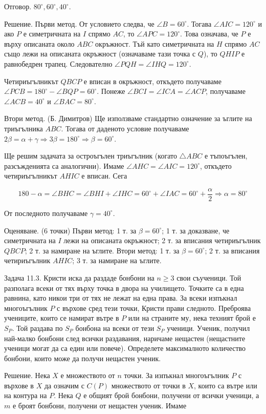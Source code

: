 Отговор. $80^\circ,60^\circ,40^\circ$.

Решение. Първи метод. От условието следва, че $\angle B=60^\circ$. Тогава $\angle AIC=120^\circ$ и ако $P$ е симетричната на $I$ спрямо $AC$, то $\angle APC=120^\circ$. Това означава, че $P$ е върху описаната около $ABC$ окръжност. Тъй като симетричната на $H$ спрямо $AC$ също лежи на описаната окръжност (означаваме тази точка с $Q$), то $QHIP$ е равнобедрен трапец. Следователно $\angle PQH=\angle IHQ=120^\circ$.

Четириъгълникът $QBCP$ е вписан в окръжност, откъдето получаваме $\angle PCB=180^\circ-\angle BQP=60^\circ$. Понеже $\angle BCI=\angle ICA=\angle ACP$, получаваме $\angle ACB=40^\circ$ и $\angle BAC=80^\circ$.

Втори метод. (Б. Димитров) Ще използваме стандартно означение за ъглите на триъгълника $ABC$. Тогава от даденото условие получаваме $2\beta=\alpha+\gamma\Longrightarrow3\beta=180^\circ\Longrightarrow\beta=60^\circ$.

Ще решим задачата за остроъгълен триъгълник (когато $\triangle ABC$ е тъпоъгълен, разсъжденията са аналогични). Имаме $\angle AHC=\angle AIC=120^\circ$, откъдето четириъгълникът $AHIC$ е вписан. Сега

$$180-\alpha=\angle BHC=\angle BHI+\angle IHC=60^\circ+\angle IAC=60^\circ+\frac\alpha2\Longrightarrow\alpha=80^\circ$$

От последното получаваме $\gamma=40^\circ$.

Оценяване. (6 точки) Първи метод: 1 т. за $\beta=60^\circ$; 1 т. за доказване, че симетричната на $I$ лежи на описаната окръжност; 2 т. за вписания четириъгълник $QBCP$; 2 т. за намиране на ъглите. Втори метод: 1 т. за $\beta=60^\circ$; 2 т. за вписания четириъгълник $AHIC$; 3 т. за намиране на ъглите.

Задача 11.3. Кристи иска да раздаде бонбони на $n\geq3$ свои съученици. Той разполага всеки от тях върху точка в двора на училището. Точките са в една равнина, като никои три от тях не лежат на една права. За всеки изпъкнал многоъгълник $P$ с върхове сред тези точки, Кристи прави следното. Преброява учениците, които се намират вътре в $P$ или на страните му, нека техният брой е $S_P$. Той раздава по $S_P$ бонбона на всеки от тези $S_P$ ученици. Ученик, получил най-малко бонбони след всички раздавания, наричаме нещастен (нещастните ученици могат да са един или повече). Определете максималното количество бонбони, които може да получи нещастен ученик.

Решение. Нека $X$ е множеството от $n$ точки. За изпъкнал многоъгълник $P$ с върхове в $X$ да означим с $C(P)$ множеството от точки в $X$, които са вътре или на контура на $P$. Нека $Q$ е общият брой бонбони, получени от всички ученици, а $m$ е броят бонбони, получени от нещастен ученик. Имаме

